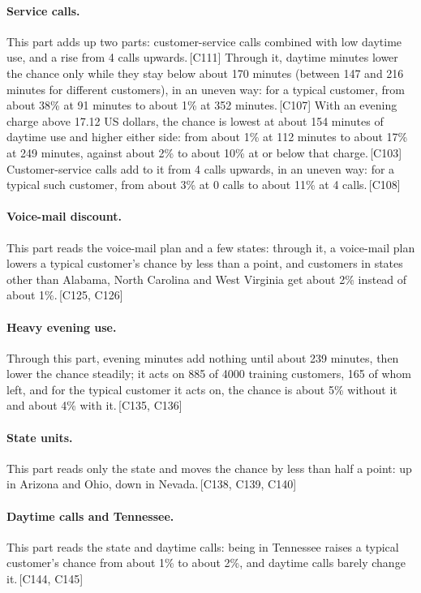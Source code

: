 \documentclass[a4paper,10pt]{article}
\newif\ifreviewmarks
\newcommand{\reviewrule}{\noindent{\color{BrickRed}\rule{\linewidth}{0.8pt}}}
\newenvironment{drafted}[1][]{%
  \ifreviewmarks\par\addvspace{\medskipamount}\reviewrule\par\nopagebreak
  \noindent{\color{BrickRed}\sffamily\footnotesize\textbf{Thesis Draft}\quad #1\hfill review}\par\nopagebreak\smallskip\fi}{%
  \ifreviewmarks\par\smallskip\noindent{\color{BrickRed}\sffamily\footnotesize end of thesis draft}\par\nopagebreak\reviewrule\par\medskip\fi}
\begin{document}
\begin{drafted}[plain-language layer: churn100-s2-c1]
\paragraph{Service calls.} This part adds up two parts: customer-service calls combined with low daytime use, and a rise from 4 calls upwards.\,{\scriptsize\textcolor{NavyBlue}{[C111]}} Through it, daytime minutes lower the chance only while they stay below about 170 minutes (between 147 and 216 minutes for different customers), in an uneven way: for a typical customer, from about 38\% at 91 minutes to about 1\% at 352 minutes.\,{\scriptsize\textcolor{NavyBlue}{[C107]}} With an evening charge above 17.12 US dollars, the chance is lowest at about 154 minutes of daytime use and higher either side: from about 1\% at 112 minutes to about 17\% at 249 minutes, against about 2\% to about 10\% at or below that charge.\,{\scriptsize\textcolor{NavyBlue}{[C103]}} Customer-service calls add to it from 4 calls upwards, in an uneven way: for a typical such customer, from about 3\% at 0 calls to about 11\% at 4 calls.\,{\scriptsize\textcolor{NavyBlue}{[C108]}}
\paragraph{Voice-mail discount.} This part reads the voice-mail plan and a few states: through it, a voice-mail plan lowers a typical customer's chance by less than a point, and customers in states other than Alabama, North Carolina and West Virginia get about 2\% instead of about 1\%.\,{\scriptsize\textcolor{NavyBlue}{[C125, C126]}}
\paragraph{Heavy evening use.} Through this part, evening minutes add nothing until about 239 minutes, then lower the chance steadily; it acts on 885 of 4000 training customers, 165 of whom left, and for the typical customer it acts on, the chance is about 5\% without it and about 4\% with it.\,{\scriptsize\textcolor{NavyBlue}{[C135, C136]}}
\paragraph{State units.} This part reads only the state and moves the chance by less than half a point: up in Arizona and Ohio, down in Nevada.\,{\scriptsize\textcolor{NavyBlue}{[C138, C139, C140]}}
\paragraph{Daytime calls and Tennessee.} This part reads the state and daytime calls: being in Tennessee raises a typical customer's chance from about 1\% to about 2\%, and daytime calls barely change it.\,{\scriptsize\textcolor{NavyBlue}{[C144, C145]}}

\end{drafted}
\end{document}
